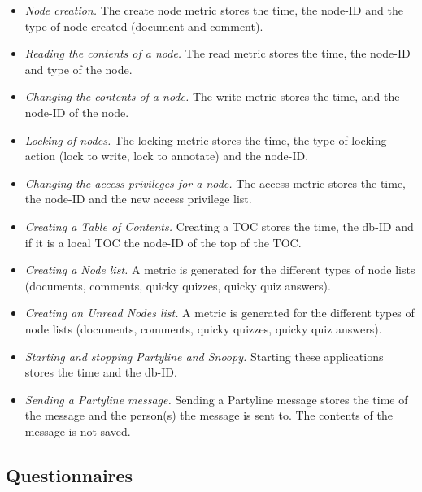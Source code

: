 \begin{itemize}

\item{\em Node creation.}  The create node metric stores the time, the
  node-ID and the type of node created (document and comment).

\item{\em Reading the contents of a node.} The read metric stores the time,
  the node-ID and type of the node.

\item{\em Changing the contents of a node.} The write metric stores the
  time, and the node-ID of the node.

\item{\em Locking of nodes.} The locking metric stores the time, the type
  of locking action (lock to write, lock to annotate) and the node-ID.

\item{\em Changing the access privileges for a node.} The access metric
  stores the time, the node-ID and the new access privilege list.

\item{\em Creating a Table of Contents.} Creating a TOC stores the time,
  the db-ID and if it is a local TOC the node-ID of the top of the TOC.

\item{\em Creating a Node list.} A metric is generated for the different
  types of node lists (documents, comments, quicky quizzes, quicky quiz
  answers).

\item{\em Creating an Unread Nodes list.} A metric is generated for the
  different types of node lists (documents, comments, quicky quizzes, quicky
  quiz answers).

\item{\em Starting and stopping Partyline and Snoopy.} Starting these
  applications stores the time and the db-ID.

\item{\em Sending a Partyline message.} Sending a Partyline message stores
  the time of the message and the person(s) the message is sent to.  The
  contents of the message is not saved.

\end{itemize}


\subsection{Questionnaires}

